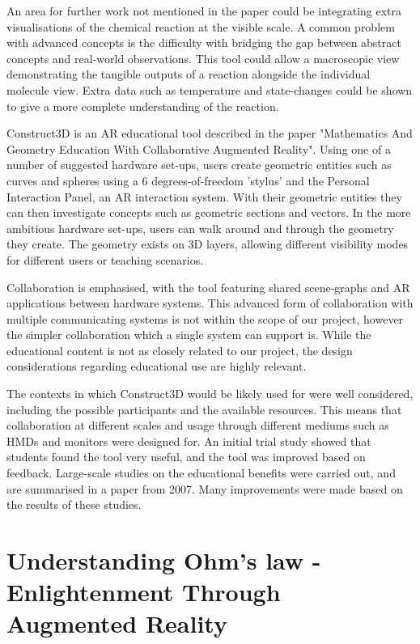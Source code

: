 An area for further work not mentioned in the paper could be integrating extra visualisations of the chemical reaction at the visible scale. A common problem with advanced concepts is the difficulty with bridging the gap between abstract concepts and real-world observations. This tool could allow a macroscopic view demonstrating the tangible outputs of a reaction alongside the individual molecule view. Extra data such as temperature and state-changes could be shown to give a more complete understanding of the reaction.

Construct3D is an AR educational tool described in the paper "Mathematics And Geometry Education With Collaborative Augmented Reality"\cite{Kaufmann03}. Using one of a number of suggested hardware set-ups, users create geometric entities such as curves and spheres using a 6 degrees-of-freedom 'stylus' and the Personal Interaction Panel, an AR interaction system\cite{szal97}. With their geometric entities they can then investigate concepts such as geometric sections and vectors. In the more ambitious hardware set-ups, users can walk around and through the geometry they create. The geometry exists on 3D layers, allowing different visibility modes for different users or teaching scenarios. 

Collaboration is emphasised, with the tool featuring shared scene-graphs and AR applications between hardware systems. This advanced form of collaboration with multiple communicating systems is not within the scope of our project, however the simpler collaboration which a single system can support is. While the educational content is not as closely related to our project, the design considerations regarding educational use are highly relevant.

The contexts in which Construct3D would be likely used for were well considered, including the possible participants and the available resources. This means that collaboration at different scales and usage through different mediums such as HMDs and monitors were designed for. An initial trial study showed that students found the tool very useful, and the tool was improved based on feedback. Large-scale studies on the educational benefits were carried out, and are summarised in a paper from 2007\cite{Kaufmann07}. Many improvements were made based on the results of these studies.

\section{Understanding Ohm's law - Enlightenment Through Augmented Reality}

